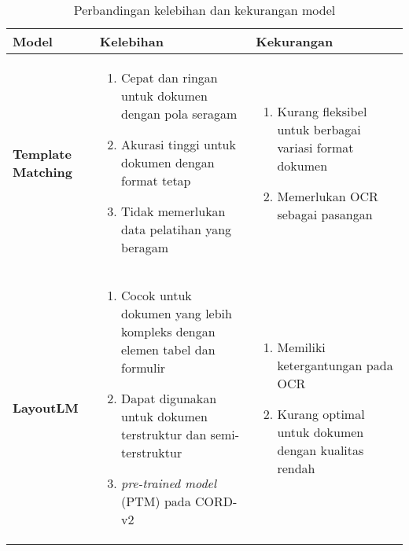 \begin{table}[h!]
\caption{Perbandingan kelebihan dan kekurangan model}
\label{tab:model-comparison}
\begin{tabularx}{\linewidth}{|p{2cm}|X|X|}
\hline
\textbf{Model} & \textbf{Kelebihan} & \textbf{Kekurangan} \\
\hline
\textbf{Template Matching} &
\begin{enumerate}
    \item Cepat dan ringan untuk dokumen dengan pola seragam
    \item Akurasi tinggi untuk dokumen dengan format tetap
    \item Tidak memerlukan data pelatihan yang beragam
\end{enumerate}
&
\begin{enumerate}
    \item Kurang fleksibel untuk berbagai variasi format dokumen
    \item Memerlukan OCR sebagai pasangan
\end{enumerate}
\\ \hline
\textbf{LayoutLM} &
\begin{enumerate}
    \item Cocok untuk dokumen yang lebih kompleks dengan elemen tabel dan formulir
    \item Dapat digunakan untuk dokumen terstruktur dan semi-terstruktur
    \item \emph{pre-trained model} (PTM) pada \dataset{} CORD-v2
\end{enumerate}
&
\begin{enumerate}
    \item Memiliki ketergantungan pada OCR
    \item Kurang optimal untuk dokumen dengan kualitas rendah
\end{enumerate}
\\ \hline
\end{tabularx}
\end{table}

